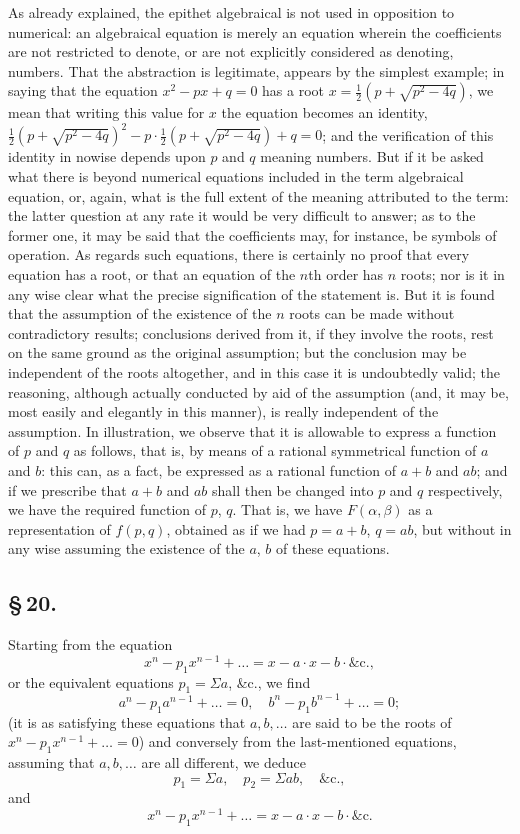 \documentclass[11pt,a4paper]{book}
\begin{document}
As already explained, the epithet algebraical is not used in opposition to numerical: an algebraical equation is merely an equation wherein the coefficients are not restricted to denote, or are not explicitly considered as denoting, numbers. That the abstraction is legitimate, appears by the simplest example; in saying that the equation $x^{2} - px + q = 0$ has a root $x = \frac{1}{2}(p + \sqrt{p^{2} - 4q})$, we mean that writing this value for $x$ the equation becomes an identity, $\frac{1}{2}(p + \sqrt{p^{2} - 4q})^{2} - p\cdot\frac{1}{2}(p + \sqrt{p^{2} - 4q}) + q = 0$; and the verification of this identity in nowise depends upon $p$ and $q$ meaning numbers. But if it be asked what there is beyond numerical equations included in the term algebraical equation, or, again, what is the full extent of the meaning attributed to the term: the latter question at any rate it would be very difficult to answer; as to the former one, it may be said that the coefficients may, for instance, be symbols of operation. As regards such equations, there is certainly no proof that every equation has a root, or that an equation of the $n$th order has $n$ roots; nor is it in any wise clear what the precise signification of the statement is. But it is found that the assumption of the existence of the $n$ roots can be made without contradictory results; conclusions derived from it, if they involve the roots, rest on the same ground as the original assumption; but the conclusion may be independent of the roots altogether, and in this case it is undoubtedly valid; the reasoning, although actually conducted by aid of the assumption (and, it may be, most easily and elegantly in this manner), is really independent of the assumption. In illustration, we observe that it is allowable to express a function of $p$ and $q$ as follows, that is, by means of a rational symmetrical function of $a$ and $b$: this can, as a fact, be expressed as a rational function of $a + b$ and $ab$; and if we prescribe that $a + b$ and $ab$ shall then be changed into $p$ and $q$ respectively, we have the required function of $p$, $q$. That is, we have $F(\alpha, \beta)$ as a representation of $f(p, q)$, obtained as if we had $p = a + b$, $q = ab$, but without in any wise assuming the existence of the $a$, $b$ of these equations.

\subsection*{\S\,20.}

Starting from the equation
\[
x^{n} - p_{1}x^{n-1} + \ldots = x - a \cdot x - b \cdot \&\text{c.},
\]
or the equivalent equations $p_{1} = \Sigma a$, \&c., we find
\[
a^{n} - p_{1}a^{n-1} + \ldots = 0, \quad b^{n} - p_{1}b^{n-1} + \ldots = 0;
\]
(it is as satisfying these equations that $a, b, \ldots$ are said to be the roots of $x^{n} - p_{1}x^{n-1} + \ldots = 0$) and conversely from the last-mentioned equations, assuming that $a, b, \ldots$ are all different, we deduce
\[
p_{1} = \Sigma a, \quad p_{2} = \Sigma ab, \quad \&\text{c.},
\]
and
\[
x^{n} - p_{1}x^{n-1} + \ldots = x - a \cdot x - b \cdot \&\text{c.}
\]
\end{document}
